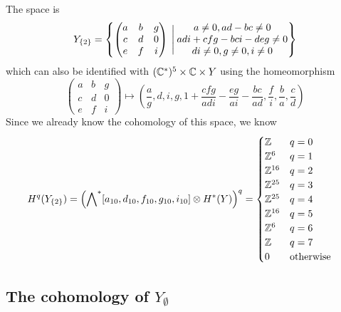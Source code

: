 The space is
\[ Y_{\left\{ 2 \right\}} = \left\{ 
  \begin{pmatrix}
    a & b & g \\
    c & d & 0 \\
    e & f & i
  \end{pmatrix} \:\Bigg\vert\:
  \begin{matrix}
    a \neq 0, ad-bc \neq 0 \\
    adi +cfg -bci - deg \neq 0 \\
    di \neq 0, g\neq 0, i \neq 0 \end{matrix}
 \right\} \]
which can also be identified with $(\mathbb{C}^*)^5\times \mathbb{C}\times Y$ using
the homeomorphism
\[ \begin{pmatrix}
  a & b & g \\
  c & d & 0 \\
  e & f & i
\end{pmatrix} \mapsto \left(\frac{a}{g},d,i,g, 1+\frac{cfg}{adi}-
  \frac{eg}{ai}-\frac{bc}{ad}, \frac{f}{i},\frac{b}{a}, \frac{c}{d}
\right)\]
Since we already know the cohomology of this space, we know
\begin{align*}
  H^q(Y_{\left\{ 2 \right\}}) = 
  \left(\bigwedge\nolimits^*[a_{10},d_{10},f_{10},g_{10},i_{10}]\otimes
  H^*(Y)\right)^q &=
  \begin{cases}
    \mathbb{Z} & q = 0 \\
    \mathbb{Z}^6 & q = 1 \\
    \mathbb{Z}^{16} & q = 2 \\
    \mathbb{Z}^{25} & q = 3 \\
    \mathbb{Z}^{25} & q = 4 \\
    \mathbb{Z}^{16} & q = 5 \\
    \mathbb{Z}^6 & q = 6 \\
    \mathbb{Z} & q = 7 \\
    0 & \text{otherwise}
  \end{cases}
\end{align*}

\subsection{The cohomology of $Y_{\emptyset}$}

